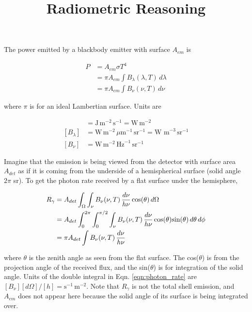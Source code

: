 \documentclass[11pt]{article}
\title{Radiometric Reasoning}
\author{}
\date{}
\begin{document}
\maketitle


The power emitted by a blackbody emitter with surface $A_{em}$ is 

\begin{align}
  P &= A_{em} \sigma T^4 \\
    &= \pi A_{em} \int B_\lambda(\lambda, T) \, d\lambda \\
    &= \pi A_{em} \int B_\nu(\nu, T) \, d\nu
\end{align}

where $\pi$ is for an ideal Lambertian surface. Units are

\begin{align}
    [\sigma T^{4}] &= \textrm{J}\,\textrm{m}^{-2}\,\textrm{s}^{-1} = \textrm{W}\,\textrm{m}^{-2} \\
    [B_{\lambda}] &= \textrm{W}\,\textrm{m}^{-2}\, \mu\textrm{m}^{-1}\,\textrm{sr}^{-1} = \textrm{W m}^{-3}\,\textrm{sr}^{-1} \\
    [B_{\nu}] &= \textrm{W}\,\textrm{m}^{-2}\, \textrm{Hz}^{-1}\,\textrm{sr}^{-1}
\end{align}

Imagine that the emission is being viewed from the detector with surface area $A_{det}$ as if it is coming from the underside of a 
hemispherical surface (solid angle $2 \pi$ sr). To get the photon rate received by a flat surface under the hemisphere, 

\begin{align}
    \label{eqn:photon_rate}
    R_{\gamma} &= A_{det} \int_{\Omega} \int_{\nu} B_{\nu}(\nu, T) \, \frac{d\nu}{h\nu} \, \textrm{cos}(\theta) \textrm \, d\Omega   \\
    &= A_{det} \int_{0}^{2\pi} \int_{0}^{\pi/2} \int_{\nu} B_{\nu}(\nu, T) \, \frac{d\nu}{h\nu} \, \textrm{cos}(\theta) \textrm{sin}(\theta) \, d\theta \, d\phi \\
    &= \pi A_{det} \int B_{\nu}(\nu, T) \, \frac{d\nu}{h\nu}  \\
\end{align}

\noindent
where $\theta$ is the zenith angle as seen from the flat surface. The cos($\theta$) is from the projection angle of the received flux, and the sin($\theta$) is for integration of the solid angle. Units of the double integral in Eqn. \ref{eqn:photon_rate} are $[B_{\nu}][d\Omega]/[h] = \textrm{s}^{-1}\,\textrm{m}^{-2}$. Note that $R_{\gamma}$ is not the total shell emission, and $A_{em}$ does not appear here because the solid angle of its surface is being integrated over.
\end{document}
